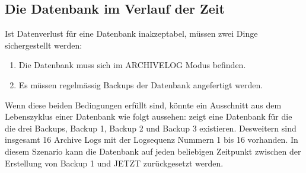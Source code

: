       \subsection{Die Datenbank im Verlauf der Zeit}
        Ist Datenverlust f\"ur eine Datenbank inakzeptabel, m\"ussen zwei Dinge sichergestellt werden:
        \begin{enumerate}
          \item Die Datenbank muss sich im ARCHIVELOG Modus befinden.
          \item Es m\"ussen regelm\"assig Backups der Datenbank angefertigt werden.
        \end{enumerate}
        Wenn diese beiden Bedingungen erf\"ullt sind, k\"onnte ein Ausschnitt aus dem Lebenszyklus einer Datenbank wie folgt aussehen:
         zeigt eine Datenbank f\"ur die die drei Backups, Backup 1, Backup 2 und Backup 3 existieren. Desweitern sind insgesamt 16 Archive Logs mit der Logsequenz Nummern 1 bis 16 vorhanden. In diesem Szenario kann die Datenbank auf jeden beliebigen Zeitpunkt zwischen der Erstellung von Backup 1 und JETZT zur\"uckgesetzt werden.

